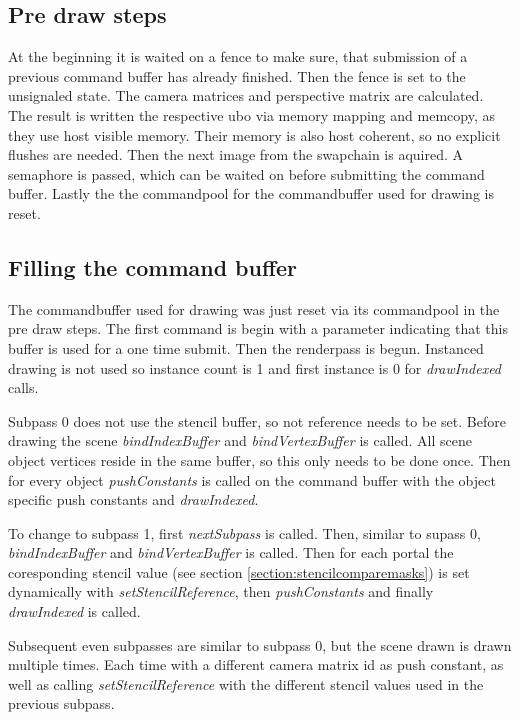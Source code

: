 \subsection{Pre draw steps}

At the beginning it is waited on a fence to make sure, that submission of a previous command buffer has already finished. Then the fence is set to the unsignaled state. The camera matrices and perspective matrix are calculated. The result is written the respective \gls{ubo} via memory mapping and memcopy, as they use host visible memory. Their memory is also host coherent, so no explicit flushes are needed.
Then the next image from the swapchain is aquired. A semaphore is passed, which can be waited on before submitting the command buffer.
Lastly the the commandpool for the commandbuffer used for drawing is reset.

\subsection{Filling the command buffer}
The commandbuffer used for drawing was just reset via its commandpool in the pre draw steps. The first command is begin with a parameter indicating that this buffer is used for a one time submit. Then the renderpass is begun. Instanced drawing is not used so instance count is 1 and first instance is 0 for \textit{drawIndexed} calls.

Subpass 0 does not use the stencil buffer, so not reference needs to be set. Before drawing the scene \textit{bindIndexBuffer} and \textit{bindVertexBuffer} is called. All scene object vertices reside in the same buffer, so this only needs to be done once. Then for every object \textit{pushConstants} is called on the command buffer with the object specific push constants and \textit{drawIndexed}. 

To change to subpass 1, first \textit{nextSubpass} is called. Then, similar to supass 0, \textit{bindIndexBuffer} and \textit{bindVertexBuffer} is called.  Then for each portal the coresponding stencil value (see section \ref{section:stencilcomparemasks}) is set dynamically with \textit{setStencilReference}, then \textit{pushConstants} and finally \textit{drawIndexed} is called.

Subsequent even subpasses are similar to subpass 0, but the scene drawn is drawn multiple times. Each time with a different camera matrix id as push constant, as well as calling \textit{setStencilReference} with the different stencil values used in the previous subpass.

